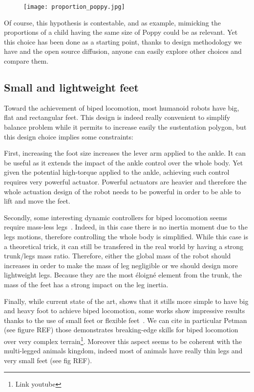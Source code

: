\begin{figure}[tb]
    \begin{center}
        \texttt{[image: proportion\_poppy.jpg]}
    \end{center}
    \caption{}
    \label{fig:poppy-human-proportion}
\end{figure}

Of course, this hypothesis is contestable, and as example, mimicking the proportions of a child having the same size of Poppy could be as relevant. Yet this choice has been done as a starting point, thanks to design methodology we have and the open source diffusion, anyone can easily explore other choices and compare them.

\subsection{Small and lightweight feet} %

Toward the achievement of biped locomotion, most humanoid robots have big, flat and rectangular feet. This design is indeed really convenient to simplify balance problem while it permits to increase easily the sustentation polygon, but this design choice implies some constraints:

First, increasing the foot size increases the lever arm applied to the ankle. It can be useful as it extends the impact of the ankle control over the whole body. Yet given the potential high-torque applied to the ankle, achieving such control requires very powerful actuator.
Powerful actuators are heavier and therefore the whole actuation design of the robot needs to be powerful in order to be able to lift and move the feet.

Secondly, some interesting dynamic controllers for biped locomotion seems require mass-less legs~\parencite{hyon2002development}. Indeed, in this case there is no inertia moment due to the legs motions, therefore controlling the whole body is simplified. While this case is a theoretical trick, it can still be transfered in the real world by having a strong trunk/legs mass ratio. Therefore, either the global mass of the robot should increases in order to make the mass of leg negligible or we should design more lightweight legs.
Because they are the most éloigné element from the trunk, the mass of the feet has a strong impact on the leg inertia.

Finally, while current state of the art, shows that it stills more simple to have big and heavy foot to achieve biped locomotion, some works show impressive results thanks to the use of small feet or flexible feet~\parencite{bruneau2001dynamic}. We can cite in particular Petman (see figure REF) those demonstrates breaking-edge skills for biped locomotion over very complex terrain\footnote{Link youtube}.
Moreover this aspect seems to be coherent with the multi-legged animals kingdom, indeed most of animals have really thin legs and very small feet (see fig REF).


